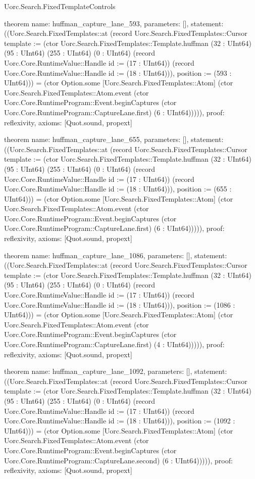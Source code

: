 \begin{lexlean}{Uorc.Search.FixedTemplateControls}
\begin{semanticmodule}
theorem{
  name: huffman_capture_lane_593,
  parameters: [],
  statement: ((Uorc.Search.FixedTemplates::at (record Uorc.Search.FixedTemplates::Cursor {template := (ctor Uorc.Search.FixedTemplates::Template.huffman (32 : UInt64) (95 : UInt64) (255 : UInt64) (0 : UInt64) (record Uorc.Core.RuntimeValue::Handle {id := (17 : UInt64)}) (record Uorc.Core.RuntimeValue::Handle {id := (18 : UInt64)})), position := (593 : UInt64)})) = (ctor Option.some [Uorc.Search.FixedTemplates::Atom] (ctor Uorc.Search.FixedTemplates::Atom.event (ctor Uorc.Core.RuntimeProgram::Event.beginCaptures (ctor Uorc.Core.RuntimeProgram::CaptureLane.first) (6 : UInt64))))),
  proof: reflexivity{},
  axioms: [Quot.sound, propext]
}

theorem{
  name: huffman_capture_lane_655,
  parameters: [],
  statement: ((Uorc.Search.FixedTemplates::at (record Uorc.Search.FixedTemplates::Cursor {template := (ctor Uorc.Search.FixedTemplates::Template.huffman (32 : UInt64) (95 : UInt64) (255 : UInt64) (0 : UInt64) (record Uorc.Core.RuntimeValue::Handle {id := (17 : UInt64)}) (record Uorc.Core.RuntimeValue::Handle {id := (18 : UInt64)})), position := (655 : UInt64)})) = (ctor Option.some [Uorc.Search.FixedTemplates::Atom] (ctor Uorc.Search.FixedTemplates::Atom.event (ctor Uorc.Core.RuntimeProgram::Event.beginCaptures (ctor Uorc.Core.RuntimeProgram::CaptureLane.first) (6 : UInt64))))),
  proof: reflexivity{},
  axioms: [Quot.sound, propext]
}

theorem{
  name: huffman_capture_lane_1086,
  parameters: [],
  statement: ((Uorc.Search.FixedTemplates::at (record Uorc.Search.FixedTemplates::Cursor {template := (ctor Uorc.Search.FixedTemplates::Template.huffman (32 : UInt64) (95 : UInt64) (255 : UInt64) (0 : UInt64) (record Uorc.Core.RuntimeValue::Handle {id := (17 : UInt64)}) (record Uorc.Core.RuntimeValue::Handle {id := (18 : UInt64)})), position := (1086 : UInt64)})) = (ctor Option.some [Uorc.Search.FixedTemplates::Atom] (ctor Uorc.Search.FixedTemplates::Atom.event (ctor Uorc.Core.RuntimeProgram::Event.beginCaptures (ctor Uorc.Core.RuntimeProgram::CaptureLane.first) (4 : UInt64))))),
  proof: reflexivity{},
  axioms: [Quot.sound, propext]
}

theorem{
  name: huffman_capture_lane_1092,
  parameters: [],
  statement: ((Uorc.Search.FixedTemplates::at (record Uorc.Search.FixedTemplates::Cursor {template := (ctor Uorc.Search.FixedTemplates::Template.huffman (32 : UInt64) (95 : UInt64) (255 : UInt64) (0 : UInt64) (record Uorc.Core.RuntimeValue::Handle {id := (17 : UInt64)}) (record Uorc.Core.RuntimeValue::Handle {id := (18 : UInt64)})), position := (1092 : UInt64)})) = (ctor Option.some [Uorc.Search.FixedTemplates::Atom] (ctor Uorc.Search.FixedTemplates::Atom.event (ctor Uorc.Core.RuntimeProgram::Event.beginCaptures (ctor Uorc.Core.RuntimeProgram::CaptureLane.second) (6 : UInt64))))),
  proof: reflexivity{},
  axioms: [Quot.sound, propext]
}


\end{semanticmodule}
\end{lexlean}
